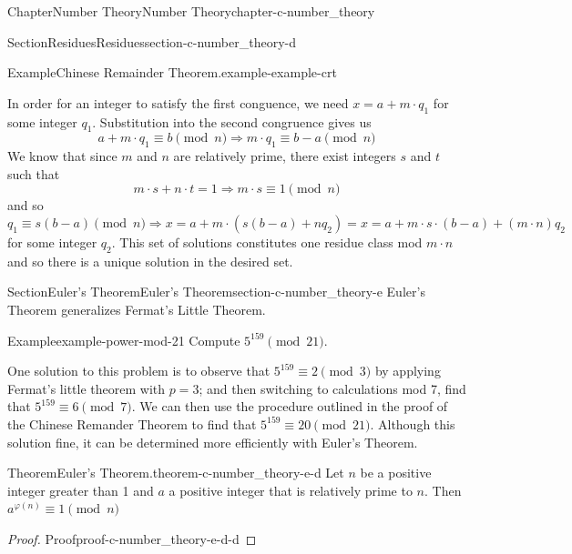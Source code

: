 \documentclass[oneside,10pt,]{book}
\numberwithin{equation}{section}
\begin{document}
\begin{chapterptx}{Chapter}{Number Theory}{}{Number Theory}{}{}{chapter-c-number_theory}
\begin{sectionptx}{Section}{Residues}{}{Residues}{}{}{section-c-number_theory-d}
\begin{example}{Example}{Chinese Remainder Theorem.}{example-example-crt}
\par
In order for an integer to satisfy the first conguence, we need \(x = a + m\cdot q_1\) for some integer \(q_1\).  Substitution into the second congruence gives us%
\begin{equation*}
a + m\cdot q_1\equiv b \pmod{n} \Rightarrow  m\cdot q_1\equiv b-a \pmod{n}
\end{equation*}
We know that since \(m\) and \(n\) are relatively prime, there exist integers \(s\) and \(t\) such that%
\begin{equation*}
m \cdot s + n \cdot t = 1  \Rightarrow   m \cdot s \equiv 1 \pmod{n}
\end{equation*}
and so%
\begin{equation*}
q_1\equiv s(b-a) \pmod{n}  \Rightarrow   x = a + m\cdot (s(b-a)+ n q_2)= x = a + m\cdot s\cdot(b-a)+ (m\cdot n) q_2 
\end{equation*}
for some integer \(q_2\). This set of solutions constitutes one residue class mod \(m \cdot n\) and so there is a unique solution in the desired set.%
\end{example}
\end{sectionptx}
%
%
\typeout{************************************************}
\typeout{************************************************}
%
\begin{sectionptx}{Section}{Euler's Theorem}{}{Euler's Theorem}{}{}{section-c-number_theory-e}
Euler's Theorem generalizes Fermat's Little Theorem.%
\begin{example}{Example}{}{example-power-mod-21}%
Compute \(5^{159} \pmod{21}\).%
\par
One solution to this problem is to observe that \(5^{159}\equiv 2 \pmod{3}\)  by applying Fermat's little theorem with \(p=3\); and then switching to calculations mod 7, find that \(5^{159}\equiv 6 \pmod{7}\).  We can then use the procedure outlined in the proof of the Chinese Remander Theorem to find that \(5^{159}\equiv 20 \pmod{21}\). Although this solution fine, it can be determined more efficiently with Euler's Theorem.%
\end{example}
\begin{theorem}{Theorem}{Euler's Theorem.}{}{theorem-c-number_theory-e-d}%
%
Let \(n\) be a positive integer greater than 1 and \(a\) a positive integer that is relatively prime to \(n\).  Then  \(a^{\varphi(n)} \equiv 1 \pmod{n}\)%
\end{theorem}
\begin{proof}{Proof}{}{proof-c-number_theory-e-d-d}

\end{proof}
\end{sectionptx}
\end{chapterptx}
\end{document}
